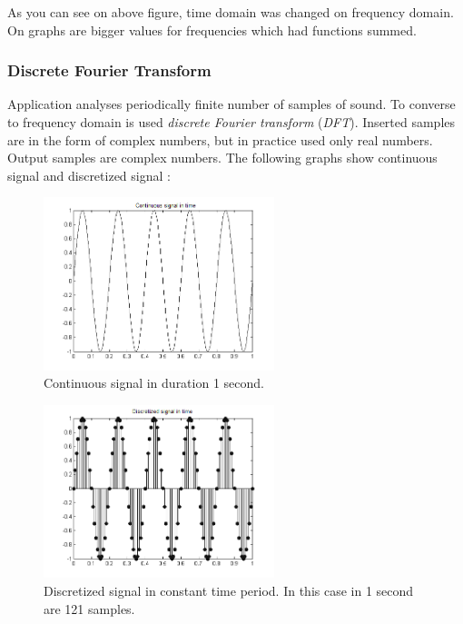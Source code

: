 \documentclass[11pt,titlepage]{article}
\theoremstyle{plain}
\begin{document}
As you can see on above figure, time domain was changed on frequency domain. On graphs are bigger values for frequencies which had functions summed.

\subsubsection{Discrete Fourier Transform}
Application analyses periodically finite number of samples of sound. To converse to frequency domain is used \textit{discrete Fourier transform} (\textit{DFT}). Inserted samples are in the form of complex numbers, but in practice used only real numbers. Output samples are complex numbers. The following graphs show continuous signal and discretized signal \cite{fourier}:

\begin{figure}[H]
	\centering
	\includegraphics[width=0.6\textwidth]{img/continues}
	\caption{Continuous signal in duration 1 second.}
	\label{fig:F6}
\end{figure}

\begin{figure}[H]
	\centering
	\includegraphics[width=0.6\textwidth]{img/descrete}
	\caption{Discretized signal in constant time period. In this case in 1 second are 121 samples.}
	\label{fig:F7}
\end{figure}
\end{document}
